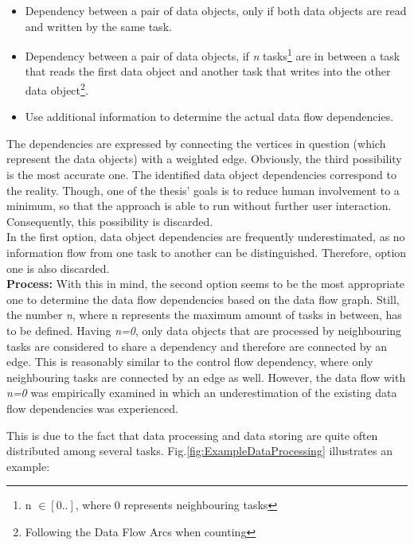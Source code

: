 \begin{itemize}
	\item Dependency between a pair of data objects, only if both data objects are read and written by the same task.
	\item Dependency between a pair of data objects, if \textit{n} tasks\footnote{n $\in [0..]$, where 0 represents neighbouring tasks} are in between a task that reads the first data object and another task that writes into the other data object\footnote{Following the Data Flow Arcs when counting}.

	\item Use additional information to determine the actual data flow dependencies.
\end{itemize}
\noindent
The dependencies are expressed by connecting the vertices in question (which represent the data objects) with a weighted edge. 
Obviously, the third possibility is the most accurate one. The identified data object dependencies correspond to the reality. Though, one of the thesis' goals is to reduce human involvement to a minimum, so that the approach is able to run without further user interaction. Consequently, this possibility is discarded. \\
In the first option, data object dependencies are frequently underestimated, as no information flow from one task to another can be distinguished. Therefore, option one is also discarded. \\

\noindent
\textbf{Process:} With this in mind, the second option seems to be the most appropriate one to determine the data flow dependencies based on the data flow graph. Still, the number \textit{n}, where n represents the maximum amount of tasks in between, has to be defined. Having \textit{n=0}, only data objects that are processed by neighbouring tasks are considered to share a dependency and therefore are connected by an edge. This is reasonably similar to the control flow dependency, where only neighbouring tasks are connected by an edge as well. However, the data flow with \textit{n=0} was empirically examined in which an underestimation of the existing data flow dependencies was experienced. 

This is due to the fact that data processing and data storing are quite often distributed among several tasks. Fig.\ref{fig:ExampleDataProcessing} illustrates an example: 


